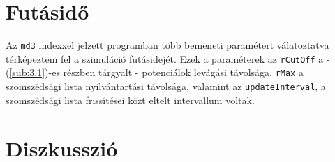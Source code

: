\begin{multicols}{2}
\section{Futásidő} \label{sec:6}
Az \texttt{md3} indexxel jelzett programban több bemeneti paramétert válatoztatva térképeztem fel a szimuláció futásidejét. Ezek a paraméterek az \texttt{rCutOff} a - (\ref{sub:3.1})-es részben tárgyalt - potenciálok levágási távolsága, \texttt{rMax} a szomszédsági lista nyilvántartási távolsága, valamint az \texttt{updateInterval}, a szomszédsági lista frissítései közt eltelt intervallum voltak.

\section{Diszkusszió} \label{sec:7}

\end{multicols}